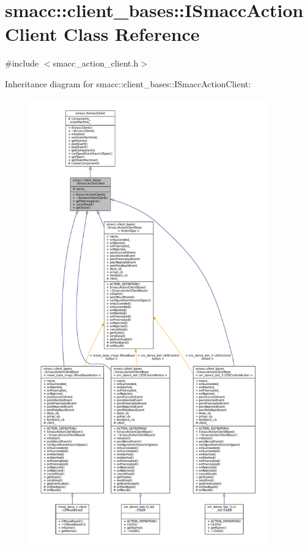 \hypertarget{classsmacc_1_1client__bases_1_1ISmaccActionClient}{}\section{smacc\+:\+:client\+\_\+bases\+:\+:I\+Smacc\+Action\+Client Class Reference}
\label{classsmacc_1_1client__bases_1_1ISmaccActionClient}


{\ttfamily \#include $<$smacc\+\_\+action\+\_\+client.\+h$>$}



Inheritance diagram for smacc\+:\+:client\+\_\+bases\+:\+:I\+Smacc\+Action\+Client\+:
\nopagebreak
\begin{figure}[H]
\begin{center}
\leavevmode
\includegraphics[height=550pt]{classsmacc_1_1client__bases_1_1ISmaccActionClient__inherit__graph}
\end{center}
\end{figure}


